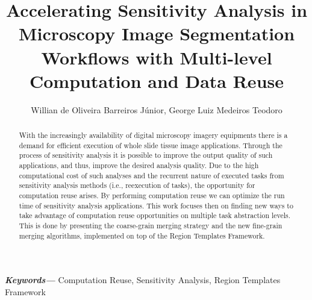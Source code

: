 \documentclass[11pt]{article}
\date{}
\author{Willian de Oliveira Barreiros J\'unior, George Luiz Medeiros Teodoro}%
\title{Accelerating Sensitivity Analysis in Microscopy Image Segmentation Workflows with Multi-level Computation and Data Reuse}%
\providecommand{\keywords}[1]
{
  \small
  \textbf{\textit{Keywords---}} #1
}
\begin{document}
%
	\maketitle

	\begin{abstract}
	With the increasingly availability of digital microscopy imagery equipments there is a demand for efficient execution of whole slide tissue image applications. Through the process of sensitivity analysis it is possible to improve the output quality of such applications, and thus, improve the desired analysis quality. Due to the high computational cost of such analyses and the recurrent nature of executed tasks from sensitivity analysis methods (i.e., reexecution of tasks), the opportunity for computation reuse arises. By performing computation reuse we can optimize the run time of sensitivity analysis applications. This work focuses then on finding new ways to take advantage of computation reuse opportunities on multiple task abstraction levels. This is done by presenting the coarse-grain merging strategy and the new fine-grain merging algorithms, implemented on top of the Region Templates Framework.
	\end{abstract}

	\hspace{10pt}
	\keywords{Computation Reuse, Sensitivity Analysis, Region Templates Framework}%

	\hspace{10pt}

    
    
    
    
    

    
    


\end{document}

